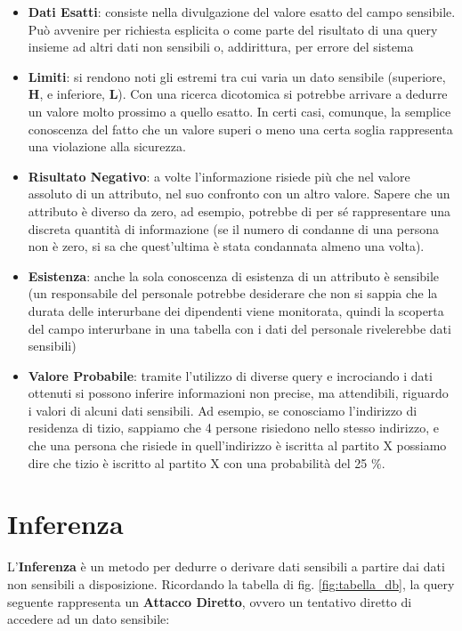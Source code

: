 \begin{itemize}
	\item\textbf{Dati Esatti}: consiste nella divulgazione del valore esatto del campo sensibile. Può avvenire per richiesta esplicita o come parte del risultato di una query insieme ad altri dati non sensibili o, addirittura, per errore del sistema
	\item \textbf{Limiti}: si rendono noti gli estremi tra cui varia un dato sensibile (superiore, \textbf{H}, e inferiore, \textbf{L}). Con una ricerca dicotomica si potrebbe arrivare a dedurre un valore molto prossimo a quello esatto. In certi casi, comunque, la semplice conoscenza del fatto che un valore superi o meno una certa soglia rappresenta una violazione alla sicurezza.
	\item \textbf{Risultato Negativo}: a volte l'informazione risiede più che nel valore assoluto di un attributo, nel suo confronto con un altro valore. Sapere che un attributo è diverso da zero, ad esempio, potrebbe di per sé rappresentare una discreta quantità di informazione (se il numero di condanne di una persona non è zero, si sa che quest'ultima è stata condannata almeno una volta).
	\item \textbf{Esistenza}: anche la sola conoscenza di esistenza di un attributo è sensibile (un responsabile del personale potrebbe desiderare che non si sappia che la durata delle interurbane dei dipendenti viene monitorata, quindi la scoperta del campo interurbane in una tabella con i dati del personale rivelerebbe dati sensibili)
	\item \textbf{Valore Probabile}: tramite l'utilizzo di diverse query e incrociando i dati ottenuti si possono inferire informazioni non precise, ma attendibili, riguardo i valori di alcuni dati sensibili. Ad esempio, se conosciamo l'indirizzo di residenza di tizio, sappiamo che 4 persone risiedono nello stesso indirizzo, e che una persona che risiede in quell'indirizzo è iscritta al partito X possiamo dire che tizio è iscritto al partito X con una probabilità del 25 $\%$.
\end{itemize}

\section{Inferenza}
L'\textbf{Inferenza} è un metodo per dedurre o derivare dati sensibili a partire dai dati non sensibili a disposizione. Ricordando la tabella di fig. \ref{fig:tabella_db}, la query seguente rappresenta un \textbf{Attacco Diretto}, ovvero un tentativo diretto di accedere ad un dato sensibile:

